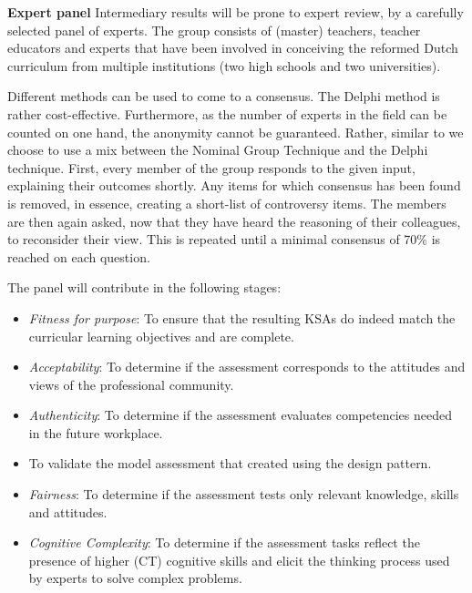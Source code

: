 \noindent\textbf{Expert panel}\newline
Intermediary results will be prone to expert review, by a carefully selected panel of experts. The group consists of (master) teachers, teacher educators and experts that have been involved in conceiving the reformed Dutch curriculum from multiple institutions (two high schools and two universities).

Different methods can be used to come to a consensus. The Delphi method is rather cost-effective. Furthermore, as the number of experts in the field can be counted on one hand, the anonymity cannot be guaranteed. Rather, similar to  we choose to use a mix between the Nominal Group Technique and the Delphi technique. First, every member of the group responds to the given input, explaining their outcomes shortly. Any items for which consensus has been found is removed, in essence, creating a short-list of controversy items. The members are then again asked, now that they have heard the reasoning of their colleagues, to reconsider their view. This is repeated until a minimal consensus of 70\% is reached on each question.

The panel will contribute in the following stages:
\begin{itemize}
\item \emph{ Fitness for purpose}: To ensure that the resulting KSAs do indeed match the curricular learning objectives and are complete.
\item \emph{Acceptability}: To determine if the assessment corresponds to the attitudes and views of the professional community.
\item \emph{Authenticity}: To determine if the assessment evaluates competencies needed in the future workplace.\item To validate the model assessment that created using the design pattern.
\item \emph{Fairness}: To determine if the assessment tests only relevant knowledge, skills and attitudes.
\item \emph{Cognitive Complexity}: To determine if the assessment tasks reflect the presence of higher (CT) cognitive skills and elicit the thinking process used by experts to solve complex problems.
\end{itemize}



